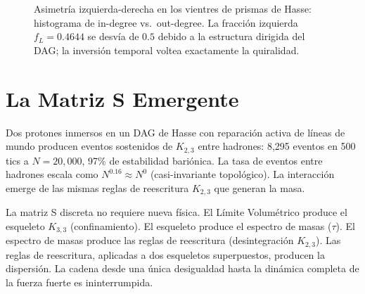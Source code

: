 \documentclass[11pt, a4paper, openany]{book}
\begin{document}
\begin{figure}[ht]
\centering
{}
\caption{Asimetr\'ia izquierda-derecha en los vientres de prismas de
Hasse: histograma de in-degree vs.\ out-degree. La fracci\'on izquierda
$f_L = 0.4644$ se desv\'ia de $0.5$ debido a la estructura dirigida del
DAG; la inversi\'on temporal voltea exactamente la quiralidad.}
\label{fig:chirality}
\end{figure}

\section{La Matriz S Emergente}

\begin{theorem}
Dos protones inmersos en un DAG de Hasse con reparaci\'on activa de
l\'ineas de mundo producen eventos sostenidos de $K_{2,3}$ entre
hadrones: 8,295 eventos en 500 tics a $N = 20{,}000$, 97\% de
estabilidad bari\'onica. La tasa de eventos entre hadrones escala como
$N^{0.16} \approx N^0$ (casi-invariante topol\'ogico). La
interacci\'on emerge de las mismas reglas de reescritura $K_{2,3}$ que
generan la masa.

La matriz S discreta no requiere nueva f\'isica. El L\'imite
Volum\'etrico produce el esqueleto $K_{3,3}$ (confinamiento). El
esqueleto produce el espectro de masas ($\tau$). El espectro de masas
produce las reglas de reescritura (desintegraci\'on $K_{2,3}$). Las
reglas de reescritura, aplicadas a dos esqueletos superpuestos,
producen la dispersi\'on. La cadena desde una \'unica desigualdad hasta
la din\'amica completa de la fuerza fuerte es ininterrumpida.
\end{theorem}
\end{document}
